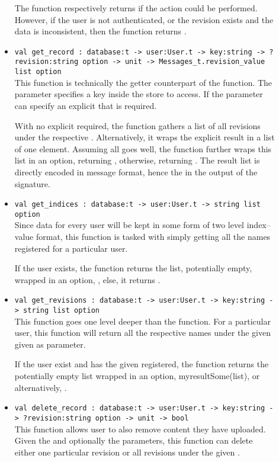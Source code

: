\begin{description}
\begin{itemize}
  The function respectively returns  if the action could be performed. However, if the user is not authenticated, or the revision exists and the data is inconsistent, then the function returns .

  \item \verb|val get_record : database:t -> user:User.t -> key:string -> ?revision:string option -> unit -> Messages_t.revision_value list option| \\
  This function is technically the getter counterpart of the  function.
  The  parameter specifies a key inside the store to access.
  If the  parameter can specify an explicit  that is required.

  With no explicit  required, the function gathers a list of all revisions under the respective . Alternatively, it wraps the explicit result in a list of one element. Assuming all goes well, the function further wraps this list in an option, returning , otherwise, returning . The result list is directly encoded in message format, hence the  in the output of the signature.

  \item \verb|val get_indices : database:t -> user:User.t -> string list option| \\
  Since data for every user will be kept in some form of two level index--value format, this function is tasked with simply getting all the  names registered for a particular user.

  If the user exists, the function returns the list, potentially empty, wrapped in an option, , else, it returns .

  \item \verb|val get_revisions : database:t -> user:User.t -> key:string -> string list option| \\
  This function goes one level deeper than the  function.
  For a particular user, this function will return all the respective  names under the given  given as parameter.

  If the user exist and has the given  registered, the function returns the potentially empty list wrapped in an option, myresult{Some(list)}, or alternatively, .

  \item \verb|val delete_record : database:t -> user:User.t -> key:string -> ?revision:string option -> unit -> bool| \\
  This function allows user to also remove content they have uploaded.
  Given the  and optionally the  parameters, this function can delete either one particular revision or all revisions under the given .


\end{itemize}
\end{description}
